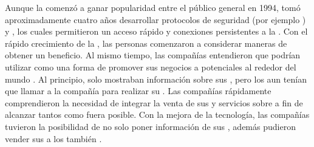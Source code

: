 Aunque la \internetINT comenzó a ganar popularidad  entre el público general en 1994, tomó aproximadamente cuatro años desarrollar protocolos de seguridad (por ejemplo \httpNAME) y \dslModemNAME, los cuales permitieron un acceso rápido y conexiones persistentes a la \internetINT. Con el rápido crecimiento de la \internetINT, las personas comenzaron a considerar maneras de obtener un beneficio. Al mismo tiempo, las compañías entendieron que podrían utilizar \internetINT  como una forma de promover sus negocios a potenciales \customersCOM al rededor del mundo \cite{cook2015mobile}. Al principio, solo mostraban información sobre sus \itemsCOM, pero los \customersCOM aun tenían que llamar a la compañía para realizar su \orderCommerce. Las compañías rápidamente comprendieron la necesidad de integrar la venta de sus \itemsCOM y servicios sobre \internetINT a fin de alcanzar tantos \customersCOM como fuera posible. Con la mejora de la tecnología, las compañías tuvieron la posibilidad de no solo poner información de sus \itemsCOM \online, además pudieron vender sus \itemsCOM a los \customersCOM  también \cite{Maamar2003commerce}.


